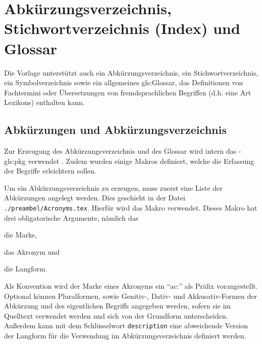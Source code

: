 \section{Abkürzungsverzeichnis, Stichwortverzeichnis (Index) und Glossar}%
\label{sec:Glossare}
%
Die Vorlage unterstützt auch ein Abkürzungsverzeichnis, ein Stichwortverzeichnis,
ein Symbolverzeichnis sowie ein allgemeines \gls{gls:Glossar},
das Definitionen von Fachtermini oder
Übersetzungen von fremdsprachlichen Begriffen
(d.h. eine Art Lexikons) enthalten kann.


\subsection{Abkürzungen und Abkürzungsverzeichnis}%
\label{sec:Akronyme}
Zur Erzeugung des Abkürzungsverzeichnis und des Glossar wird intern das
-\gls{gls:pkg} verwendet \cite{talbot2014}.
Zudem wurden einige Makros definiert, welche die Erfassung der Begriffe erleichtern sollen.

Um ein Abkürzungsverzeichnis zu erzeugen, muss zuerst eine Liste der Abkürzungen angelegt werden.
Dies geschieht in der Datei \texttt{./preambel/Acronyms.tex}.
Hierfür wird das Makro  verwendet.
Dieses Makro hat drei obligatorische Argumente, nämlich das
\begin{itemize*}
\item die Marke,
\item das Akronym und
\item die Langform.
\end{itemize*}
Als Konvention wird der Marke eines Akronyms ein \enquote{ac:} als Präfix vorangestellt.
Optional können Pluralformen, sowie Genitiv-, Dativ- und Akkusativ-Formen 
der Abkürzung und des eigentlichen Begriffs angegeben werden,
sofern sie im Quelltext verwendet werden und sich von der Grundform unterscheiden.
Außerdem kann mit dem Schlüsselwort \texttt{description}
eine abweichende Version der Langform für die Verwendung im Abkürzungsverzeichnis definiert werden.

